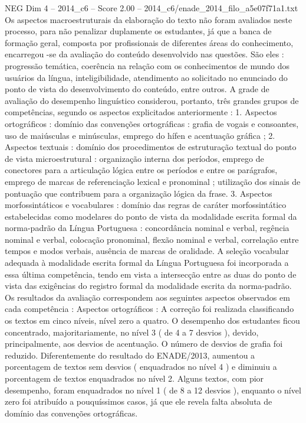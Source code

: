 \begin{textsample}{NEG Dim 4 – 2014\_c6 – Score 2.00 – 2014\_c6/enade\_2014\_filo\_a5e07f71a1.txt}
Os aspectos macroestruturais da elaboração do texto não foram avaliados neste processo, para não penalizar duplamente os estudantes, já que a banca de formação geral, composta por profissionais de diferentes áreas do conhecimento, encarregou -se da avaliação do conteúdo desenvolvido nas questões.
São eles : progressão temática, coerência na relação com os conhecimentos de mundo dos usuários da língua, inteligibilidade, atendimento ao solicitado no enunciado do ponto de vista do desenvolvimento do conteúdo, entre outros.
A grade de avaliação do desempenho linguístico considerou, portanto, três grandes grupos de competências, segundo os aspectos explicitados anteriormente : 1.
Aspectos ortográficos : domínio das convenções ortográficas : grafia de vogais e consoantes, uso de maiúsculas e minúsculas, emprego do hífen e acentuação gráfica ; 2.
Aspectos textuais : domínio dos procedimentos de estruturação textual do ponto de vista microestrutural : organização interna dos períodos, emprego de conectores para a articulação lógica entre os períodos e entre os parágrafos, emprego de marcas de referenciação lexical e pronominal ; utilização dos sinais de pontuação que contribuem para a organização lógica da frase. 3.
Aspectos morfossintáticos e vocabulares : domínio das regras de caráter morfossintático estabelecidas como modelares do ponto de vista da modalidade escrita formal da norma-padrão da Língua Portuguesa : concordância nominal e verbal, regência nominal e verbal, colocação pronominal, flexão nominal e verbal, correlação entre tempos e modos verbais, ausência de marcas de oralidade.
A seleção vocabular adequada à modalidade escrita formal da Língua Portuguesa foi incorporada a essa última competência, tendo em vista a intersecção entre as duas do ponto de vista das exigências do registro formal da modalidade escrita da norma-padrão.
Os resultados da avaliação correspondem aos seguintes aspectos observados em cada competência : Aspectos ortográficos : A correção foi realizada classificando os textos em cinco níveis, nível zero a quatro.
O desempenho dos estudantes ficou concentrado, majoritariamente, no nível 3 ( de 4 a 7 desvios ), devido, principalmente, aos desvios de acentuação.
O número de desvios de grafia foi reduzido.
Diferentemente do resultado do ENADE/2013, aumentou a porcentagem de textos sem desvios ( enquadrados no nível 4 ) e diminuiu a porcentagem de textos enquadrados no nível 2.
Alguns textos, com pior desempenho, foram enquadrados no nível 1 ( de 8 a 12 desvios ), enquanto o nível zero foi atribuído a pouquíssimos casos, já que ele revela falta absoluta de domínio das convenções ortográficas.

\end{textsample}
